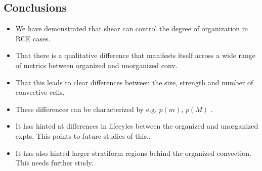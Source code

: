 \documentclass[11pt,a4paper]{article}
\begin{document}
\subsection{Conclusions}
\begin{itemize}
    \item We have demonstrated that shear can control the degree of organization in RCE cases.
    \item That there is a qualitative difference that manifests itself across a wide range of metrics between organized and unorganized conv.
    \item That this leads to clear differences between the size, strength and number of convective cells.
    \item These differences can be characterized by e.g. $p(m)$, $p(M)$ .
    \item It has hinted at differences in lifecyles between the organized and unorganized expts. This points to future studies of this..
    \item It has also hinted larger stratiform regions behind the organized convection. This needs further study.
\end{itemize}

%
%
\printbibliography[title={References}]
\end{document}
